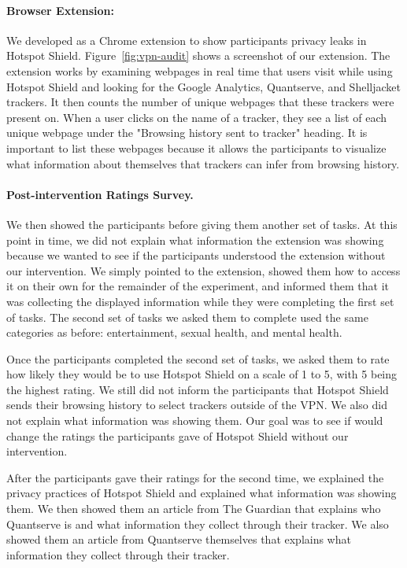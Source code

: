 \paragraph{Browser Extension: \tool}
We developed \tool as a Chrome extension to show participants privacy leaks
in Hotspot Shield.  Figure~\ref{fig:vpn-audit} shows a screenshot of our extension.
The extension works by examining webpages in real time that users visit while
using Hotspot Shield and looking for the Google Analytics, Quantserve, and
Shelljacket trackers.  It then counts the number of unique webpages that these
trackers were present on.  When a user clicks on the name of a tracker, they
see a list of each unique webpage under the "Browsing history sent to tracker"
heading. It is important to list these webpages because it allows the participants to visualize what information about themselves that trackers can infer from browsing history.


\paragraph{Post-intervention Ratings Survey.}
We then showed the participants \tool before giving them another set of tasks.
At this point in time, we did not explain what information the extension was showing because we wanted to see if the participants understood the extension without our intervention.
We simply pointed to the extension, showed them how to access it on their own for the remainder of the experiment, and informed them that it was collecting the displayed information while they were completing the first set of tasks.
The second set of tasks we asked them to complete used the same categories as before: entertainment, sexual health, and mental health. 

Once the participants completed the second set of tasks, we asked them to rate how likely they would be to use Hotspot Shield on a scale of 1 to 5, with 5 being the highest rating.
We still did not inform the participants that Hotspot Shield sends their browsing history to select trackers outside of the VPN.
We also did not explain what information \tool was showing them.
Our goal was to see if \tool would change the ratings the participants gave of Hotspot Shield without our intervention.

After the participants gave their ratings for the second time, we explained the privacy practices of Hotspot Shield and explained what information \tool was showing them.
We then showed them an article from The Guardian that explains who Quantserve is and what information they collect through their tracker.
We also showed them an article from Quantserve themselves that explains what information they collect through their tracker.

